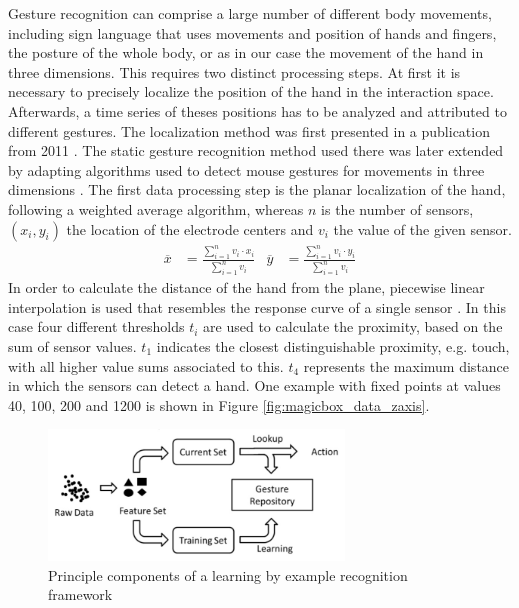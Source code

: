 Gesture recognition can comprise a large number of different body movements, including sign language that uses movements and position of hands and fingers, the posture of the whole body, or as in our case the movement of the hand in three dimensions. This requires two distinct processing steps. At first it is necessary to precisely localize the position of the hand in the interaction space. Afterwards, a time series of theses positions has to be analyzed and attributed to different gestures. The localization method was first presented in a publication from 2011 \cite{Braun2011MultiInputDevice}. The static gesture recognition method used there was later extended by adapting algorithms used to detect mouse gestures for movements in three dimensions \cite{braun2013capacitive}. 
The first data processing step is the planar localization of the hand, following a weighted average algorithm, whereas $n$ is the number of sensors, $(x_i, y_i)$ the location of the electrode centers and $v_i$ the value of the given sensor.
\begin{align}
\overline{x}&=\frac{\sum^n_{i=1}{v_i\cdot x_i}}{\sum^n_{i=1}{v_i}} & \overline{y}&=\frac{\sum^n_{i=1}{v_i\cdot y_i}}{\sum^n_{i=1}{v_i}}
\end{align}
In order to calculate the distance of the hand from the plane, piecewise linear interpolation is used that resembles the response curve of a single sensor \cite{Braun2011MultiInputDevice}. In this case four different thresholds $t_i$ are used to calculate the proximity, based on the sum of sensor values. $t_1$ indicates the closest distinguishable proximity, e.g. touch, with all higher value sums associated to this. $t_4$ represents the maximum distance in which the sensors can detect a hand. One example with fixed points at values 40, 100, 200 and 1200 is shown in Figure \ref{fig:magicbox_data_zaxis}.

\begin{figure}[h]
\centering
\includegraphics[width=0.7\textwidth]{images/gesture_by_example}
\caption{Principle components of a learning by example recognition framework \cite{braun2013capacitive}}
\label{fig:gesture_by_example}
\end{figure}

